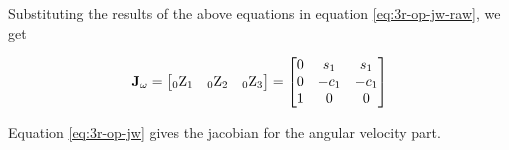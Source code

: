 Substituting the results of the above equations in equation \ref{eq:3r-op-jw-raw}, we get

\begin{align}
    \mathbf{J_\omega} = \begin{bmatrix}
        _0\textup{Z}_1 & _0\textup{Z}_2 & _0\textup{Z}_3
        \end{bmatrix} = \begin{bmatrix}
        0 & s_1 & s_1 \\
        0 & -c_1 & -c_1 \\
        1 & 0 & 0
        \end{bmatrix}
    \label{eq:3r-op-jw}
\end{align}

Equation \ref{eq:3r-op-jw} gives the jacobian for the angular velocity part.
